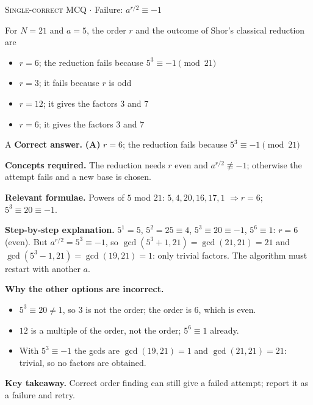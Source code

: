 \documentclass[11pt,a4paper]{article}
\newcommand{\optlabel}[1]{\textbf{(#1)}}
\newcommand{\correctlabel}[1]{\textcolor{okgreen}{\textbf{(#1)}\,\ding{51}}}
\newenvironment{qitem}[1]{\begin{list}{}{\setlength{\leftmargin}{3.3em}\setlength{\labelwidth}{3.1em}%
  \setlength{\labelsep}{0.2em}\setlength{\topsep}{3pt}\setlength{\parsep}{3pt}}\item[\textbf{Q.#1}\hfill]}{\end{list}}
\newcommand{\qsep}{\par\vspace{2pt}{\color{black!15}\hrule}\vspace{4pt}}
\newcommand{\qmeta}[2]{{\footnotesize\color{black!60}\textsc{#1} \;$\cdot$\; #2}\par}
\begin{document}
\begin{qitem}{11}
\qmeta{Single-correct MCQ}{Failure: $a^{r/2} \equiv -1$}
For $N = 21$ and $a = 5$, the order $r$ and the outcome of Shor's classical reduction are
\begin{itemize}[leftmargin=2.6em, labelsep=0.4em, itemsep=2pt, topsep=3pt]
\item[\correctlabel{A}] $r = 6$; the reduction fails because $5^3 \equiv -1 \pmod{21}$
\item[\optlabel{B}] $r = 3$; it fails because $r$ is odd
\item[\optlabel{C}] $r = 12$; it gives the factors $3$ and $7$
\item[\optlabel{D}] $r = 6$; it gives the factors $3$ and $7$
\end{itemize}
\end{qitem}
\begin{solbox}{A}
\textbf{\color{brand}Correct answer.} \textcolor{okgreen}{\textbf{(A)}} $r = 6$; the reduction fails because $5^3 \equiv -1 \pmod{21}$

\textbf{\color{brand}Concepts required.} The reduction needs $r$ even and $a^{r/2} \not\equiv -1$; otherwise the attempt fails and a new base is chosen.

\textbf{\color{brand}Relevant formulae.} Powers of $5$ mod $21$: $5, 4, 20, 16, 17, 1$ $\Rightarrow r = 6$; $5^3 \equiv 20 \equiv -1$.

\textbf{\color{brand}Step-by-step explanation.} $5^1 = 5$, $5^2 = 25 \equiv 4$, $5^3 \equiv 20 \equiv -1$, $5^6 \equiv 1$: $r = 6$ (even). But $a^{r/2} = 5^3 \equiv -1$, so
$\gcd(5^3 + 1, 21) = \gcd(21, 21) = 21$ and $\gcd(5^3 - 1, 21) = \gcd(19, 21) = 1$: only trivial factors. The algorithm must restart with another $a$.

\textbf{\color{brand}Why the other options are incorrect.}
\begin{itemize}[leftmargin=2.4em, itemsep=1pt, topsep=2pt]
\item[\textbf{(B)}] $5^3 \equiv 20 \ne 1$, so $3$ is not the order; the order is $6$, which is even.
\item[\textbf{(C)}] $12$ is a multiple of the order, not the order; $5^6 \equiv 1$ already.
\item[\textbf{(D)}] With $5^3 \equiv -1$ the gcds are $\gcd(19, 21) = 1$ and $\gcd(21, 21) = 21$: trivial, so no factors are obtained.
\end{itemize}
\textbf{\color{brand}Key takeaway.} Correct order finding can still give a failed attempt; report it as a failure and retry.
\end{solbox}
\qsep
\end{document}
